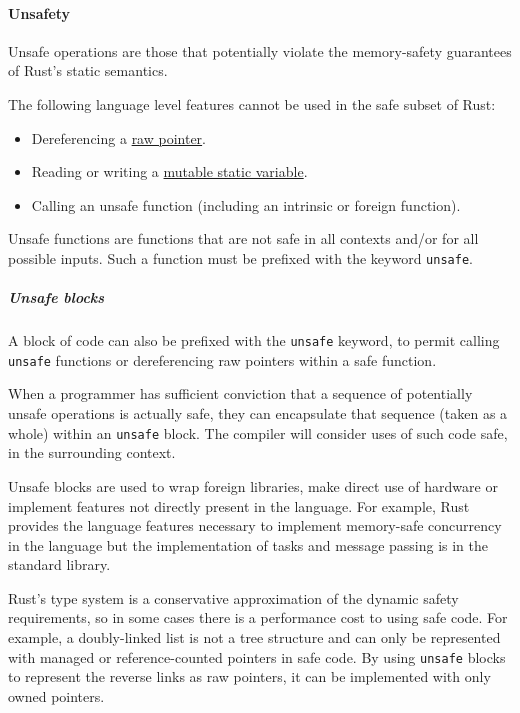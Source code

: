 \documentclass[]{article}
\begin{document}
\paragraph{Unsafety}\label{unsafety}

Unsafe operations are those that potentially violate the memory-safety
guarantees of Rust's static semantics.

The following language level features cannot be used in the safe subset
of Rust:

\begin{itemize}
\itemsep1pt\parskip0pt
\item
  Dereferencing a \hyperref[pointer-types]{raw pointer}.
\item
  Reading or writing a \hyperref[mutable-statics]{mutable static
  variable}.
\item
  Calling an unsafe function (including an intrinsic or foreign
  function).
\end{itemize}


Unsafe functions are functions that are not safe in all contexts and/or
for all possible inputs. Such a function must be prefixed with the
keyword \texttt{unsafe}.

\subparagraph{Unsafe blocks}\label{unsafe-blocks}

A block of code can also be prefixed with the \texttt{unsafe} keyword,
to permit calling \texttt{unsafe} functions or dereferencing raw
pointers within a safe function.

When a programmer has sufficient conviction that a sequence of
potentially unsafe operations is actually safe, they can encapsulate
that sequence (taken as a whole) within an \texttt{unsafe} block. The
compiler will consider uses of such code safe, in the surrounding
context.

Unsafe blocks are used to wrap foreign libraries, make direct use of
hardware or implement features not directly present in the language. For
example, Rust provides the language features necessary to implement
memory-safe concurrency in the language but the implementation of tasks
and message passing is in the standard library.

Rust's type system is a conservative approximation of the dynamic safety
requirements, so in some cases there is a performance cost to using safe
code. For example, a doubly-linked list is not a tree structure and can
only be represented with managed or reference-counted pointers in safe
code. By using \texttt{unsafe} blocks to represent the reverse links as
raw pointers, it can be implemented with only owned pointers.
\end{document}
